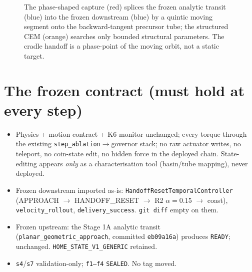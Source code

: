 \documentclass[11pt]{article}
\newcommand{\code}[1]{\texttt{\small #1}}
\begin{document}
\begin{figure}[h]\centering
\caption{The phase-shaped capture (red) splices the frozen analytic transit (blue) into the frozen downstream (blue) by a
quintic moving segment onto the backward-tangent precursor tube; the structured CEM (orange) searches only bounded
structural parameters. The cradle handoff is a phase-point of the moving orbit, not a static target.}\end{figure}

\section{The frozen contract (must hold at every step)}
\begin{itemize}[nosep,leftmargin=1.4em]
  \item Physics + motion contract + K6 monitor unchanged; every torque through the existing
  \code{step\_ablation}$\to$governor stack; no raw actuator writes, no teleport, no coin-state edit, no hidden force in
  the deployed chain. State-editing appears \emph{only} as a characterisation tool (basin/tube mapping), never deployed.
  \item Frozen downstream imported as-is: \code{HandoffResetTemporalController} (APPROACH $\to$ HANDOFF\_RESET $\to$ R2
  $\alpha{=}0.15$ $\to$ coast), \code{velocity\_rollout}, \code{delivery\_success}. \code{git diff} empty on them.
  \item Frozen upstream: the Stage 1A analytic transit (\code{planar\_geometric\_approach}, committed \code{eb09a16a})
  produces \code{READY}; unchanged. \code{HOME\_STATE\_V1\_GENERIC} retained.
  \item \code{s4}/\code{s7} validation-only; \code{f1--f4} \code{SEALED}. No tag moved.
\end{itemize}
\end{document}
